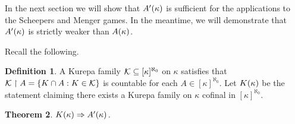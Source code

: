 \documentclass{amsart}
\theoremstyle{plain}
\newtheorem{theorem}{Theorem}
\theoremstyle{definition}
\newtheorem{definition}[theorem]{Definition}
\theoremstyle{remark}
\theoremstyle{plain}
\theoremstyle{definition}
\theoremstyle{remark}
\begin{document}
  In the next section we will show that \(A'(\kappa)\) is sufficient
  for the applications to the Scheepers and Menger games.
  In the meantime, we will demonstrate that \(A'(\kappa)\) is strictly
  weaker than \(A(\kappa)\).

  Recall the following.

  \begin{definition}
    A Kurepa family \(\mathcal{K}\subseteq[\kappa]^{\aleph_0}\) on \(\kappa\)
    satisfies that
    \(\mathcal{K}\restriction A=\{K\cap A:K\in\mathcal{K}\}\) is countable
    for each \(A\in[\kappa]^{\aleph_0}\).
    Let \(K(\kappa)\) be the statement claiming there exists
    a Kurepa family on \(\kappa\)
    cofinal in \([\kappa]^{\aleph_0}\).
  \end{definition}

  \begin{theorem}
    \(K(\kappa) \Rightarrow A'(\kappa)\).
  \end{theorem}
\end{document}
